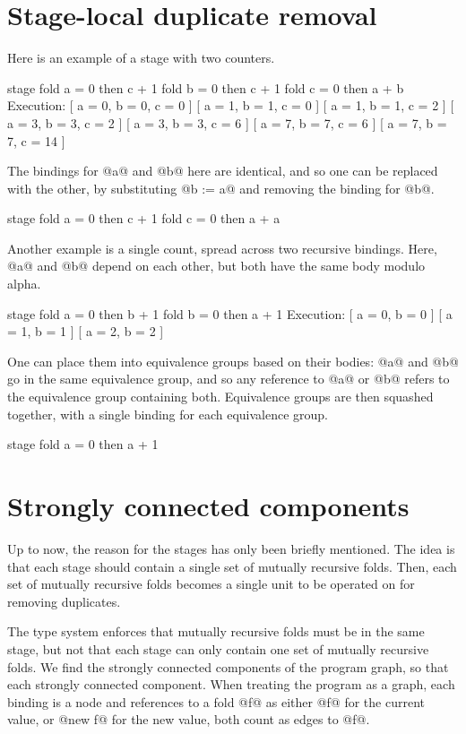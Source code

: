 \section{Stage-local duplicate removal}
Here is an example of a stage with two counters.
\begin{code}
stage {
  fold a = 0 then c + 1
  fold b = 0 then c + 1
  fold c = 0 then a + b
}
Execution:
[ a = 0, b = 0, c = 0 ]
[ a = 1, b = 1, c = 0 ]
[ a = 1, b = 1, c = 2 ]
[ a = 3, b = 3, c = 2 ]
[ a = 3, b = 3, c = 6 ]
[ a = 7, b = 7, c = 6 ]
[ a = 7, b = 7, c = 14 ]
\end{code}

The bindings for @a@ and @b@ here are identical, and so one can be replaced with the other, by substituting @b := a@ and removing the binding for @b@.
\begin{code}
stage {
  fold a = 0 then c + 1
  fold c = 0 then a + a
}
\end{code}

Another example is a single count, spread across two recursive bindings.
Here, @a@ and @b@ depend on each other, but both have the same body modulo alpha.
\begin{code}
stage {
  fold a = 0 then b + 1
  fold b = 0 then a + 1
}
Execution:
[ a = 0, b = 0 ]
[ a = 1, b = 1 ]
[ a = 2, b = 2 ]
\end{code}

One can place them into equivalence groups based on their bodies: @a@ and @b@ go in the same equivalence group, and so any reference to @a@ or @b@ refers to the equivalence group containing both.
Equivalence groups are then squashed together, with a single binding for each equivalence group.
\begin{code}
stage {
  fold a = 0 then a + 1
}
\end{code}




\section{Strongly connected components}
Up to now, the reason for the stages has only been briefly mentioned.
The idea is that each stage should contain a single set of mutually recursive folds.
Then, each set of mutually recursive folds becomes a single unit to be operated on for removing duplicates.

The type system enforces that mutually recursive folds must be in the same stage, but not that each stage can only contain one set of mutually recursive folds.
We find the strongly connected components of the program graph, so that each strongly connected component.
When treating the program as a graph, each binding is a node and references to a fold @f@ as either @f@ for the current value, or @new f@ for the new value, both count as edges to @f@.

